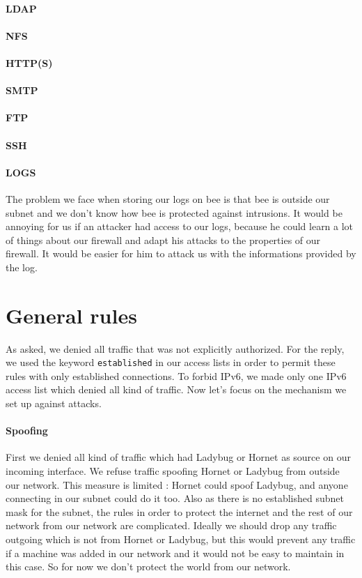 \documentclass[a4paper,titlepage]{article}
\begin{document}
\paragraph{LDAP}
\paragraph{NFS}
\paragraph{HTTP(S)}
\paragraph{SMTP}
\paragraph{FTP}
\paragraph{SSH}
\paragraph{LOGS} The problem we face when storing our logs on bee is that bee is outside our subnet and we don't know how bee is protected against intrusions. It would be annoying for us if an attacker had access to our logs, because he could learn a lot of things about our firewall and adapt his attacks to the properties of our firewall. It would be easier for him to attack us with the informations provided by the log.

\section{General rules}
As asked, we denied all traffic that was not explicitly authorized. For the reply, we used the keyword \texttt{established} in our access lists in order to permit these rules with only established connections. To forbid IPv6, we made only one IPv6 access list which denied all kind of traffic. Now let's focus on the mechanism we set up against attacks.

\paragraph{Spoofing}
First we denied all kind of traffic which had Ladybug or Hornet as source on our incoming interface. We refuse traffic spoofing Hornet or Ladybug from outside our network. This measure is limited : Hornet could spoof Ladybug, and anyone connecting in our subnet could do it too. Also as there is no established subnet mask for the subnet, the rules in order to protect the internet and the rest of our network from our network are complicated. Ideally we should drop any traffic outgoing which is not from Hornet or Ladybug, but this would prevent any traffic if a machine was added in our network and it would not be easy to maintain in this case. So for now we don't protect the world from our network.
\end{document}
